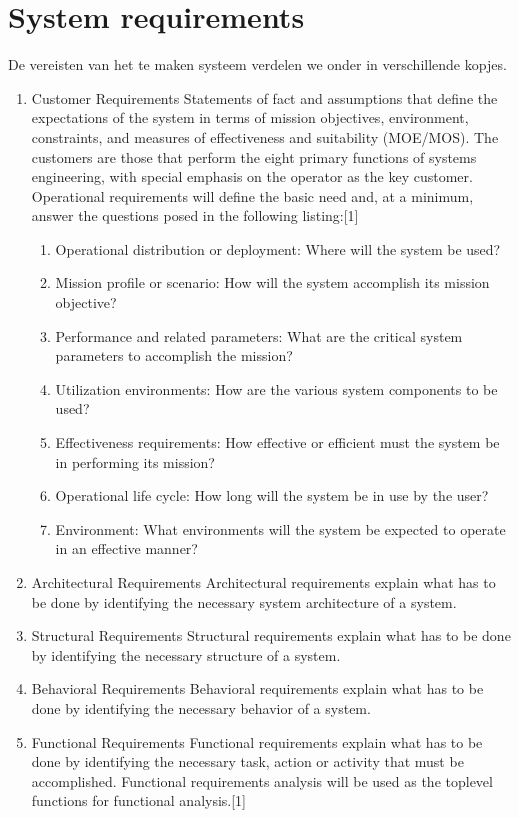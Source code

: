 \documentclass{article}
\begin{document}
\section{System requirements}
De vereisten van het te maken systeem verdelen we onder in verschillende kopjes.
\begin{enumerate}
	
	\item{Customer Requirements}
	Statements of fact and assumptions that define the expectations of the system in terms of mission objectives, environment, constraints, and measures of effectiveness and suitability (MOE/MOS). The customers are those that perform the eight primary functions of systems engineering, with special emphasis on the operator as the key customer. Operational requirements will define the basic need and, at a minimum, answer the questions posed in the following listing:[1]
	\begin{enumerate}
		\item{Operational distribution or deployment:} Where will the system be used?
		\item{Mission profile or scenario:} How will the system accomplish its mission objective?
		\item{Performance and related parameters:} What are the critical system parameters to accomplish the mission?
		\item{Utilization environments:} How are the various system components to be used?
		\item{Effectiveness requirements:} How effective or efficient must the system be in performing its mission?
		\item{Operational life cycle:} How long will the system be in use by the user?
		\item{Environment:} What environments will the system be expected to operate in an effective manner?
	\end{enumerate}
	\item{Architectural Requirements}
	Architectural requirements explain what has to be done by identifying the necessary system architecture of a system.
	\item{Structural Requirements}
	Structural requirements explain what has to be done by identifying the necessary structure of a system.
	\item{Behavioral Requirements}
	Behavioral requirements explain what has to be done by identifying the necessary behavior of a system.
	\item{Functional Requirements}
	Functional requirements explain what has to be done by identifying the necessary task, action or activity that must be accomplished. Functional requirements analysis will be used as the toplevel functions for functional analysis.[1]

\end{enumerate}
\end{document}
